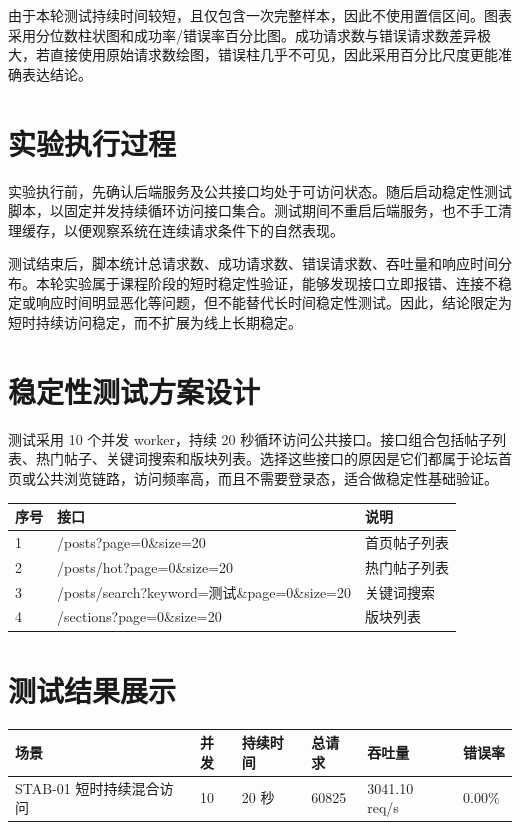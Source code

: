 \documentclass[UTF8,a4paper,12pt]{ctexart}
\begin{document}
由于本轮测试持续时间较短，且仅包含一次完整样本，因此不使用置信区间。图表采用分位数柱状图和成功率/错误率百分比图。成功请求数与错误请求数差异极大，若直接使用原始请求数绘图，错误柱几乎不可见，因此采用百分比尺度更能准确表达结论。

\section{实验执行过程}
实验执行前，先确认后端服务及公共接口均处于可访问状态。随后启动稳定性测试脚本，以固定并发持续循环访问接口集合。测试期间不重启后端服务，也不手工清理缓存，以便观察系统在连续请求条件下的自然表现。

测试结束后，脚本统计总请求数、成功请求数、错误请求数、吞吐量和响应时间分布。本轮实验属于课程阶段的短时稳定性验证，能够发现接口立即报错、连接不稳定或响应时间明显恶化等问题，但不能替代长时间稳定性测试。因此，结论限定为短时持续访问稳定，而不扩展为线上长期稳定。

\section{稳定性测试方案设计}
测试采用 10 个并发 worker，持续 20 秒循环访问公共接口。接口组合包括帖子列表、热门帖子、关键词搜索和版块列表。选择这些接口的原因是它们都属于论坛首页或公共浏览链路，访问频率高，而且不需要登录态，适合做稳定性基础验证。

\begin{longtable}{P{1.2cm}P{9.2cm}P{3.3cm}}
\toprule
序号 & 接口 & 说明\\
 & /posts?page=0\&size=20 & 首页帖子列表\\
2 & /posts/hot?page=0\&size=20 & 热门帖子列表\\
3 & /posts/search?keyword=测试\&page=0\&size=20 & 关键词搜索\\
4 & /sections?page=0\&size=20 & 版块列表\\
\bottomrule
\end{longtable}

\section{测试结果展示}
\begin{longtable}{P{3.2cm}P{1.8cm}P{2.0cm}P{2.0cm}P{2.0cm}P{2.0cm}}
\toprule
场景 & 并发 & 持续时间 & 总请求 & 吞吐量 & 错误率\\
\midrule
STAB-01 短时持续混合访问 & 10 & 20 秒 & 60825 & 3041.10 req/s & 0.00\%\\
\bottomrule
\end{longtable}
\end{document}
